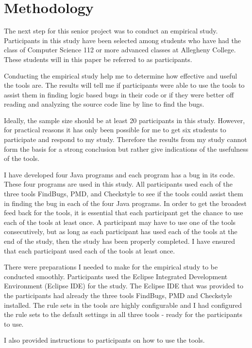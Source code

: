 \chapter{Methodology}\label{ch:methodology}

The next step for this senior project was to conduct an empirical study. Participants in this study have been selected among students who have had the class of Computer Science 112 or more advanced classes at Allegheny College. These students will in this paper be referred to as participants. 

Conducting the empirical study help me to determine how effective and useful the tools are. The results will tell me if participants were able to use the tools to assist them in finding logic based bugs in their code or if they were better off reading and analyzing the source code line by line to find the bugs.  
 
Ideally, the sample size should be at least 20 participants in this study. However, for practical reasons it has only been possible for me to get six students to participate and respond to my study. Therefore the results from my study cannot form the basis for a strong conclusion but rather give indications of the usefulness of the tools.  

I have developed four Java programs and each program has a bug in its code. These four programs are used in this study. All participants  used each of the three tools FindBugs, PMD, and Checkstyle to see if the tools could assist them in finding the bug in each of the four Java programs. In order to get the broadest feed back for the tools, it is essential that each participant get the chance to use each of the tools at least once. A participant may have to use one of the tools consecutively, but as long as each participant has used each of the tools at the end of the study, then the study has been properly completed. I have ensured that each participant used each of the tools at least once. 
 
There were preparations I needed to make for the empirical study to be conducted smoothly. Participants used the Eclipse Integrated Development Environment (Eclipse IDE) for the study. The Eclipse IDE that was provided to the participants had already the three tools FindBugs, PMD and Checkstyle installed. The rule sets in the tools are highly configurable and I had configured the rule sets to the default settings in all three tools - ready for the participants to use. 

I also provided instructions to participants on how to use the tools.  

